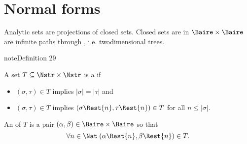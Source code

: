 \documentclass[letterpaper,10pt,english]{jupyterBook}
\begin{document}
\section{Normal forms}
\label{\detokenize{coanalytic:normal-forms}}
\sphinxAtStartPar
Analytic sets are projections of closed sets. Closed sets are in \(\Baire\times \Baire\) are infinite paths through , i.e. two\sphinxhyphen{}dimensional trees.
\label{coanalytic:def-two-dim-tree}
\begin{sphinxadmonition}{note}{Definition 29}



\sphinxAtStartPar
A set \(T \subseteq \Nstr \times \Nstr\)  is a  if
\begin{itemize}
\item {} 
\sphinxAtStartPar
{} \((\sigma,\tau) \in T\) implies \(|\sigma|=|\tau|\) and

\item {} 
\sphinxAtStartPar
{} \((\sigma,\tau) \in T\) implies \((\sigma\Rest{n},\tau\Rest{n}) \in T\) for all \(n \leq |\sigma|\).

\end{itemize}

\sphinxAtStartPar
An  of \(T\) is a pair \((\alpha,\beta) \in \Baire\times \Baire\) so that
\begin{equation*}
    \forall n\in \Nat \; (\alpha\Rest{n},\beta\Rest{n}) \in T.
\end{equation*}\end{sphinxadmonition}
\end{document}
